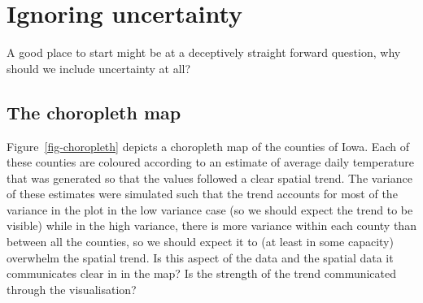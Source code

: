 \documentclass[
  12pt]{article}
\begin{document}
\section{Ignoring uncertainty}\label{ignoring-uncertainty}

A good place to start might be at a deceptively straight forward
question, why should we include uncertainty at all?

\subsection{The choropleth map}\label{the-choropleth-map}

Figure~\ref{fig-choropleth} depicts a choropleth map of the counties of
Iowa. Each of these counties are coloured according to an estimate of
average daily temperature that was generated so that the values followed
a clear spatial trend. The variance of these estimates were simulated
such that the trend accounts for most of the variance in the plot in the
low variance case (so we should expect the trend to be visible) while in
the high variance, there is more variance within each county than
between all the counties, so we should expect it to (at least in some
capacity) overwhelm the spatial trend. Is this aspect of the data and
the spatial data it communicates clear in in the map? Is the strength of
the trend communicated through the visualisation?
\end{document}
